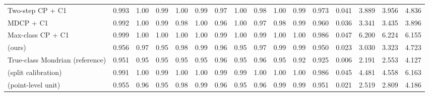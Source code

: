 \begin{table}[!htbp]
{\begin{tabular}{lccccccccccccccc}
Two-step CP + C1 & 0.993 & 1.00 & 0.99 & 1.00 & 0.99 & 0.97 & 1.00 & 0.98 & 1.00 & 0.99 & 0.973 & 0.041 & 3.889 & 3.956 & 4.836 \\
MDCP + C1 & 0.992 & 1.00 & 0.99 & 0.98 & 1.00 & 0.96 & 1.00 & 0.97 & 0.98 & 0.99 & 0.960 & 0.036 & 3.341 & 3.435 & 3.896 \\
Max-class CP + C1 & 0.999 & 1.00 & 1.00 & 1.00 & 1.00 & 0.99 & 1.00 & 0.99 & 1.00 & 1.00 & 0.986 & 0.047 & 6.200 & 6.224 & 6.155 \\
\gamut{} (ours) & 0.956 & 0.97 & 0.95 & 0.98 & 0.99 & 0.96 & 0.95 & 0.97 & 0.99 & 0.99 & 0.950 & 0.023 & 3.030 & 3.323 & 4.723 \\
True-class Mondrian (reference) & 0.951 & 0.95 & 0.95 & 0.95 & 0.95 & 0.96 & 0.95 & 0.96 & 0.95 & 0.92 & 0.925 & 0.006 & 2.191 & 2.553 & 4.127 \\
\gamut{} (split calibration) & 0.991 & 1.00 & 0.99 & 1.00 & 1.00 & 0.99 & 0.99 & 1.00 & 1.00 & 1.00 & 0.986 & 0.045 & 4.481 & 4.558 & 6.163 \\
\gamut{} (point-level unit) & 0.955 & 0.96 & 0.95 & 0.98 & 0.99 & 0.96 & 0.95 & 0.96 & 0.99 & 0.99 & 0.951 & 0.021 & 2.519 & 2.809 & 4.186 \\
\bottomrule
\end{tabular}}
\end{table}
\FloatBarrier
